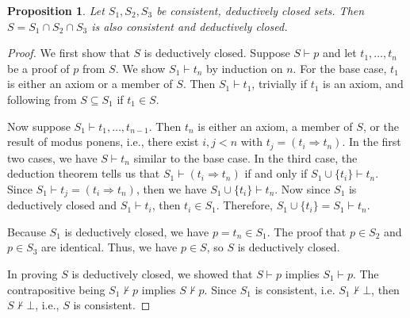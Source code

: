 \documentclass[12pt]{article}
\newtheorem{proposition}{Proposition}
\renewcommand{\implies}{\Rightarrow}
\newcommand{\proves}{\vdash}
\begin{document}
\begin{proposition}
    Let $S_1, S_2, S_3$ be consistent, deductively closed sets. Then $S = S_1 \cap S_2 \cap S_3$ is also consistent and deductively closed.
\end{proposition}

\begin{proof}
    We first show that $S$ is deductively closed. Suppose $S \proves p$ and let $t_1, \dots, t_n$ be a proof of $p$ from $S$. We show $S_1 \proves t_n$ by induction on $n$. For the base case, $t_1$ is either an axiom or a member of $S$. Then $S_1 \proves t_1$, trivially if $t_1$ is an axiom, and following from $S \subseteq S_1$ if $t_1 \in S$.
    
    Now suppose $S_1 \proves t_1, \dots, t_{n-1}$. Then $t_n$ is either an axiom, a member of $S$, or the result of modus ponens, i.e., there exist $i, j < n$ with $t_j = (t_i \implies t_n)$. In the first two cases, we have $S \proves t_n$ similar to the base case. In the third case, the deduction theorem tells us that $S_1 \proves (t_i \implies t_n)$ if and only if $S_1 \cup \{t_i\} \proves t_n$. Since $S_1 \proves t_j = (t_i \implies t_n)$, then we have $S_1 \cup \{t_i\} \proves t_n$. Now since $S_1$ is deductively closed and $S_1 \proves t_i$, then $t_i \in S_1$. Therefore, $S_1 \cup \{t_i\} = S_1 \proves t_n$.
    
    Because $S_1$ is deductively closed, we have $p = t_n \in S_1$. The proof that $p \in S_2$ and $p \in S_3$ are identical. Thus, we have $p \in S$, so $S$ is deductively closed.
    
    In proving $S$ is deductively closed, we showed that $S \proves p$ implies $S_1 \proves p$. The contrapositive being $S_1 \not\proves p$ implies $S \not\proves p$. Since $S_1$ is consistent, i.e. $S_1 \not\proves \bot$, then $S \not\proves \bot$, i.e., $S$ is consistent.
    
\end{proof}
\end{document}
